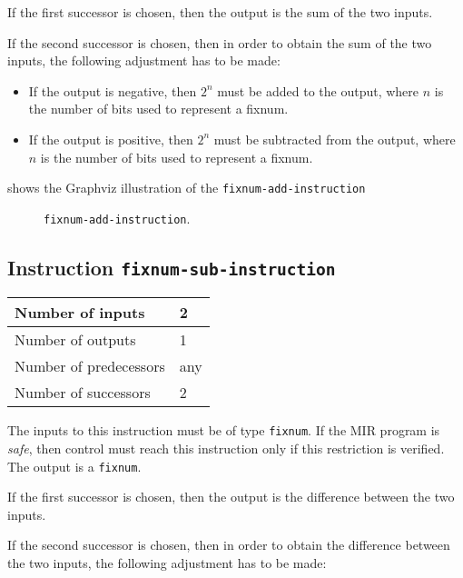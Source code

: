 If the first successor is chosen, then the output is
the sum of the two inputs.  

If the second successor is chosen, then in order to obtain the sum of the
two inputs, the following adjustment has to be made:

\begin{itemize}
\item If the output is negative, then $2^n$ must be added to the
  output, where $n$ is the number of bits used to represent a fixnum. 
\item If the output is positive, then $2^n$ must be subtracted from
  the output, where $n$ is the number of bits used to represent a
  fixnum.
\end{itemize}

 shows the Graphviz illustration of the
\texttt{fixnum-add-instruction}

\begin{figure}
\begin{center}
\end{center}
\caption{\label{fig-fixnum-add-instruction}
\texttt{fixnum-add-instruction}.}
\end{figure}

\subsection{Instruction \texttt{fixnum-sub-instruction}}
\label{mir-instruction-fixnum-sub}

\begin{tabular}{|l|l|}
\hline
Number of inputs & 2\\
\hline
Number of outputs & 1\\
\hline
Number of predecessors & any\\
\hline
Number of successors & 2\\
\hline
\end{tabular}

The inputs to this instruction must be of type \texttt{fixnum}.  If the
MIR program is \emph{safe}, then control must reach this instruction
only if this restriction is verified.  The output is a
\texttt{fixnum}.  

If the first successor is chosen, then the output is
the difference between the two inputs.  

If the second successor is chosen, then in order to obtain the difference
between the two inputs, the following adjustment has to be made:

